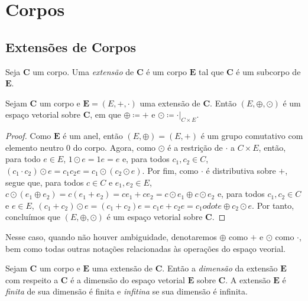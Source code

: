 \newpage

\chapter{Corpos}

\section{Extensões de Corpos}

\begin{defi}
	Seja $\bm C$ um corpo. Uma \emph{extensão} de $\bm C$ é um corpo $\bm E$ tal que $\bm C$ é um subcorpo de $\bm E$.
\end{defi}

\begin{prop}
	Sejam $\bm C$ um corpo e $\bm E = (E,+,\cdot)$ uma extensão de $\bm C$. Então $(E,\oplus,\odot)$ é um espaço vetorial sobre $\bm C$, em que $\oplus \coloneqq +$ e $\odot \coloneqq \cdot|_{C \times E}$.
\end{prop}
\begin{proof}
	Como $\bm E$ é um anel, então $(E,\oplus)=(E,+)$ é um grupo comutativo com elemento neutro $0$ do corpo. Agora, como $\odot$ é a restrição de $\cdot$ a $C \times E$, então, para todo $e \in E$, $1 \odot e = 1e = e$ e, para todos $c_1,c_2 \in C$, $(c_1 \cdot c_2) \odot e = c_1c_2e = c_1 \odot (c_2 \odot e)$. Por fim, como $\cdot$ é distributiva sobre $+$, segue que, para todos $c \in C$ e $e_1,e_2 \in E$, $c \odot (e_1 \oplus e_2) = c(e_1+e_2) = ce_1+ce_2 = c \odot e_1 \oplus c \odot e_2$ e, para todos $c_1,c_2 \in C$ e $e \in E$, $(c_1+c_2) \odot e = (c_1+c_2)e = c_1e+c_2e = c_1 odot e \oplus c_2 \odot e$. Por tanto, concluímos que $(E,\oplus,\odot)$ é um espaço vetorial sobre $\bm C$.
\end{proof}

\begin{nota}
	Nesse caso, quando não houver ambiguidade, denotaremos $\oplus$ como $+$ e $\odot$ como $\cdot$, bem como todas outras notações relacionadas às operações do espaço veorial.
\end{nota}

\begin{defi}
	Sejam $\bm C$ um corpo e $\bm E$ uma extensão de $\bm C$. Então a \emph{dimensão} da extensão $\bm E$ com respeito a $\bm C$ é a dimensão do espaço vetorial $\bm E$ sobre $\bm C$. A extensão $\bm E$ é \emph{finita} de sua dimensão é finita e \emph{infitina} se sua dimensão é infinita.
\end{defi}

